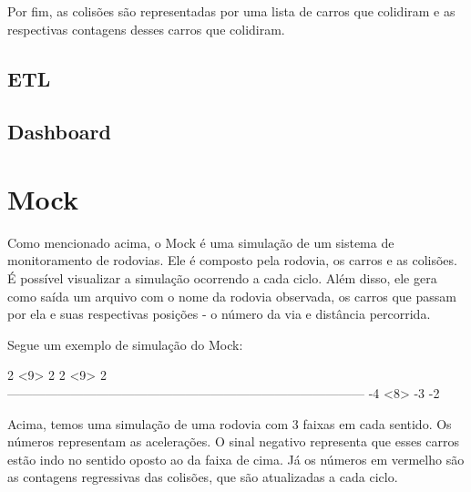 \documentclass{article}
\def\openesc{\color{red}}
\def\closeesc{\color{black}}
\def\vbdelim{\catcode`<=\active\catcode`>=\active%
\def<{\openesc}
\def>{\closeesc}}
\begin{document}
    Por fim, as colisões são representadas por uma lista de carros que colidiram e as respectivas
    contagens desses carros que colidiram.

    \subsection*{ETL}
    \lipsum[1]

    \subsection*{Dashboard}
    \lipsum[2]

    \section{Mock}
    Como mencionado acima, o Mock é uma simulação de um sistema de monitoramento de rodovias.
    Ele é composto pela rodovia, os carros e as colisões. É possível visualizar a simulação
    ocorrendo a cada ciclo. Além disso, ele gera como saída um arquivo com o nome da rodovia
    observada, os carros que passam por ela e suas respectivas posições - o número da via e 
    distância percorrida.
    
    Segue um exemplo de simulação do Mock:

    \begin{verbnobox}[\vbdelim]
2                                                     <9>                                                                                                           2                                                                                                                                        
 2                                                        <9>                 
                               2                                            
------------------------------------------------------------------------------------
                                                 -4                         
                                                 <8>                        -3         
             -2
    \end{verbnobox}
    
    Acima, temos uma simulação de uma rodovia com 3 faixas em cada sentido. Os números representam
    as acelerações. O sinal negativo representa que esses carros estão indo no sentido oposto ao
    da faixa de cima. Já os números em vermelho são as contagens regressivas das colisões, que são
    atualizadas a cada ciclo.
\end{document}
